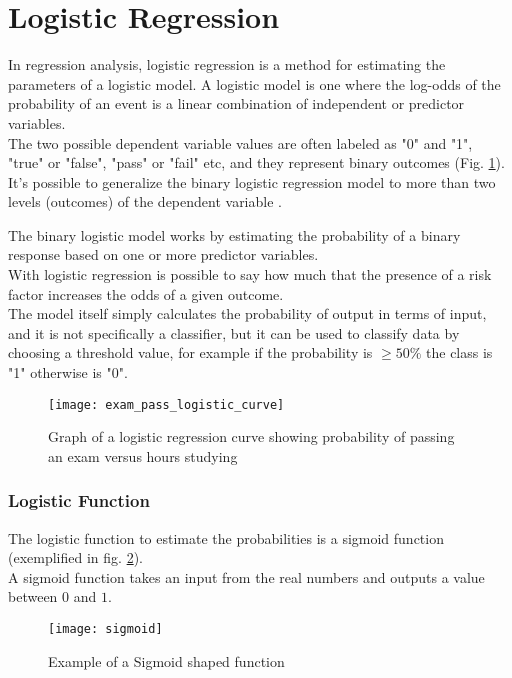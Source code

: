 \pagebreak

\section{Logistic Regression}
In regression analysis, logistic regression is a method for estimating the parameters of a logistic model. A logistic model is one where the log-odds of the probability of an event is a linear combination of independent or predictor variables. \\
The two possible dependent variable values are often labeled as "0" and "1", "true" or "false", "pass" or "fail" etc, and they represent binary outcomes (Fig. \ref{fig:logistic_exam}). \\
It's possible to generalize the binary logistic regression model to more than two levels (outcomes) of the dependent variable \cite{wiki:logisticreg}.

The binary logistic model works by estimating the probability of a binary response based on one or more predictor variables.\\
With logistic regression is possible to say how much that the presence of a risk factor increases the odds of a given outcome. \\
The model itself simply calculates the probability of output in terms of input, and it is not specifically a classifier, but it can be used to classify data by choosing a threshold value, for example if the probability is $\ge 50\%$ the class is "1" otherwise is "0".

\begin{figure}[H]
	\centering
	\texttt{[image: exam\_pass\_logistic\_curve]}
	\caption{Graph of a logistic regression curve showing probability of passing an exam versus hours studying \cite{wiki:logisticreg}}
	\label{fig:logistic_exam}
\end{figure}

\subsubsection{Logistic Function}
The logistic function to estimate the probabilities is a sigmoid function (exemplified in fig. \ref{fig:sigmoid}). \\
A sigmoid function takes an input from the real numbers and outputs a value between $0$ and $1$.

\begin{figure}[H]
	\centering
	\texttt{[image: sigmoid]}
	\caption{Example of a Sigmoid shaped function}
	\label{fig:sigmoid}
\end{figure}


